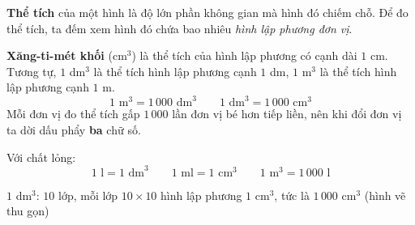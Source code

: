 \gdef\cuboidVT#1#2#3#4{\coordinate (Q) at (0,0); \coordinate (P) at (#1,0); \coordinate (C) at (#1,#3); \coordinate (D) at (0,#3);
 \coordinate (M) at ({0.5*#2},{0.38*#2}); \coordinate (N) at ($(P)+(M)$); \coordinate (B) at ($(C)+(M)$); \coordinate (A) at ($(D)+(M)$);
 \fill[tmBlue!6] (Q)--(P)--(C)--(D)--cycle; \fill[tmBlue!3] (D)--(C)--(B)--(A)--cycle; \fill[tmBlue!13] (P)--(N)--(B)--(C)--cycle;
 \ifdim #4pt>0pt \coordinate (wl) at (0,#4);
  \fill[cyan!30] (Q)--(P)--($(P)+(wl)$)--($(Q)+(wl)$)--cycle; \fill[cyan!45] (P)--(N)--($(N)+(wl)$)--($(P)+(wl)$)--cycle;
  \fill[cyan!16] ($(Q)+(wl)$)--($(P)+(wl)$)--($(N)+(wl)$)--($(M)+(wl)$)--cycle;
  \draw[cyan!60!black,line width=0.5pt] ($(Q)+(wl)$)--($(P)+(wl)$)--($(N)+(wl)$);
  \draw[cyan!60!black,line width=0.4pt,dashed] ($(N)+(wl)$)--($(M)+(wl)$)--($(Q)+(wl)$); \fi
 \draw[geo,dashed,line width=0.6pt] (M)--(Q) (M)--(N) (M)--(A);
 \draw[geo] (Q)--(P)--(C)--(D)--cycle (D)--(A)--(B)--(C) (P)--(N)--(B);}
\begin{knowbox}
\begin{minipage}[t]{0.6\linewidth}
\textbf{Thể tích} của một hình là độ lớn phần không gian mà hình đó chiếm chỗ. Để đo thể tích, ta đếm xem hình đó chứa bao nhiêu \emph{hình lập phương đơn vị}.\par
\smallskip
\textbf{Xăng-ti-mét khối} (cm$^3$) là thể tích của hình lập phương có cạnh dài $1$ cm. Tương tự, $1$ dm$^3$ là thể tích hình lập phương cạnh $1$ dm, $1$ m$^3$ là thể tích hình lập phương cạnh $1$ m.
\[1\text{ m}^3=1\,000\text{ dm}^3\qquad 1\text{ dm}^3=1\,000\text{ cm}^3\]
Mỗi đơn vị đo thể tích gấp $1\,000$ lần đơn vị bé hơn tiếp liền, nên khi đổi đơn vị ta dời dấu phẩy \textbf{ba} chữ số.\par
\smallskip
Với chất lỏng:\[1\text{ l}=1\text{ dm}^3\qquad 1\text{ ml}=1\text{ cm}^3\qquad 1\text{ m}^3=1\,000\text{ l}\]\vspace{-\baselineskip}
\end{minipage}\hfill
\begin{minipage}[t]{0.36\linewidth}\vspace{6pt}\centering
{}\par\smallskip
{\scriptsize\color{Slate} $1$ dm$^3$: $10$ lớp, mỗi lớp $10\times10$ hình lập phương $1$ cm$^3$, tức là $1\,000$ cm$^3$ (hình vẽ thu gọn)}
\end{minipage}
\end{knowbox}
